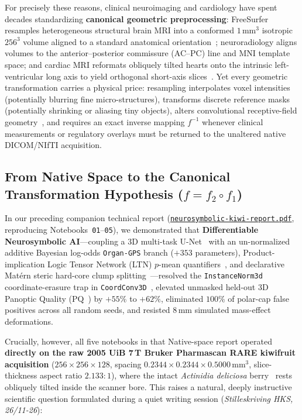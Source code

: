 \documentclass[10pt,a4paper]{article}
\renewcommand{\_}{\origunderscore\allowbreak}
\newcommand{\ghblob}{https://github.com/arvidl/BMED365-2027/blob/main}
\newcommand{\repodir}{Lab4-Comp-Imag/Kiwi-challenge/docs/neurosymbolic-report}
\newcommand{\natrep}{\href{\ghblob/\repodir/neurosymbolic-kiwi-report.pdf}{\texttt{neurosymbolic-\allowbreak kiwi-\allowbreak report.pdf}}}
\begin{document}
For precisely these reasons, clinical neuroimaging and cardiology have spent decades standardizing \textbf{canonical geometric preprocessing}: FreeSurfer resamples heterogeneous structural brain MRI into a conformed $1\,\text{mm}^3$ isotropic $256^3$ volume aligned to a standard anatomical orientation~\cite{fischl2012freesurfer}; neuroradiology aligns volumes to the anterior--posterior commissure (AC--PC) line and MNI template space; and cardiac MRI reformats obliquely tilted hearts onto the intrinsic left-ventricular long axis to yield orthogonal short-axis slices~\cite{hill2001registration}. Yet every geometric transformation carries a physical price: resampling interpolates voxel intensities (potentially blurring fine micro-structures), transforms discrete reference masks (potentially shrinking or aliasing tiny objects), alters convolutional receptive-field geometry~\cite{isensee2021nnunet}, and requires an exact inverse mapping $f^{-1}$ whenever clinical measurements or regulatory overlays must be returned to the unaltered native DICOM/NIfTI acquisition.

\subsection{From Native Space to the Canonical Transformation Hypothesis ($f = f_2 \circ f_1$)}
\label{sec:intro_hypothesis}

In our preceding companion technical report (\natrep{}, reproducing Notebooks~\texttt{01}--\texttt{05}), we demonstrated that \textbf{Differentiable Neurosymbolic AI}---coupling a 3D multi-task U-Net~\cite{cicek2016unet3d} with an un-normalized additive Bayesian log-odds \texttt{Organ-GPS} branch ($+353$ parameters), Product-implication Logic Tensor Network (LTN) $p$-mean quantifiers~\cite{badreddine2022ltn}, and declarative Mat\'ern steric hard-core clump splitting~\cite{matern1986spatial}---resolved the \texttt{InstanceNorm3d}~\cite{ulyanov2016instancenorm} coordinate-erasure trap in \texttt{CoordConv3D}~\cite{liu2018coordconv}, elevated unmasked held-out 3D Panoptic Quality ($\text{PQ}$~\cite{kirillov2019panoptic}) by $+55\%$ to $+62\%$, eliminated $100\%$ of polar-cap false positives across all random seeds, and resisted $8\,\text{mm}$ simulated mass-effect deformations.

Crucially, however, all five notebooks in that Native-space report operated \textbf{directly on the raw 2005 UiB 7\,T Bruker Pharmascan RARE kiwifruit acquisition} ($256 \times 256 \times 128$, spacing $0.2344 \times 0.2344 \times 0.5000\,\text{mm}^3$, slice-thickness aspect ratio $2.133:1$), where the intact \textit{Actinidia deliciosa} berry~\cite{richardson2011kiwidev,guo2013kiwivascular} rests obliquely tilted inside the scanner bore. This raises a natural, deeply instructive scientific question formulated during a quiet writing session (\textit{Stilleskriving HKS, 26/11-26}):
\end{document}
